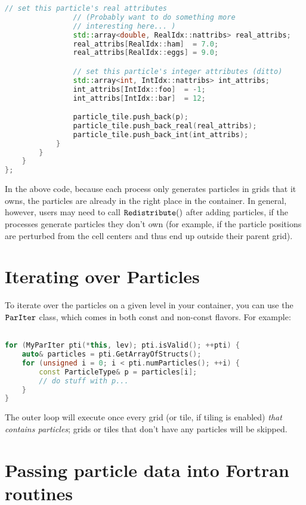 \begin{lstlisting}[language=cpp]
                // set this particle's real attributes
                // (Probably want to do something more 
                // interesting here... )
                std::array<double, RealIdx::nattribs> real_attribs;
                real_attribs[RealIdx::ham]  = 7.0;
                real_attribs[RealIdx::eggs] = 9.0;

                // set this particle's integer attributes (ditto)
                std::array<int, IntIdx::nattribs> int_attribs;
                int_attribs[IntIdx::foo]  = -1;
                int_attribs[IntIdx::bar]  = 12; 

                particle_tile.push_back(p);
                particle_tile.push_back_real(real_attribs);
                particle_tile.push_back_int(int_attribs);
            }
        }
    }
};

\end{lstlisting}

In the above code, because each process only generates particles in grids that it owns, the particles are already in the right place in the container. 
In general, however, users may need to call $\tt{Redistribute()}$ after adding particles, if the processes generate particles they don't own (for example,
if the particle positions are perturbed from the cell centers and thus end up outside their parent grid).

\section{Iterating over Particles}
\label{sec:Particles:Iterating}

To iterate over the particles on a given level in your container, you can use the $\tt{ParIter}$ class, which comes in 
both const and non-const flavors. For example:

\begin{lstlisting}[language=cpp]

for (MyParIter pti(*this, lev); pti.isValid(); ++pti) {
    auto& particles = pti.GetArrayOfStructs();
    for (unsigned i = 0; i < pti.numParticles(); ++i) {
        const ParticleType& p = particles[i];
        // do stuff with p...
    }
}
\end{lstlisting}

The outer loop will execute once every grid (or tile, if tiling is enabled) \emph{that contains particles}; grids or tiles
that don't have any particles will be skipped. 

\section{Passing particle data into Fortran routines}
\label{sec:Particles:Fortran}

